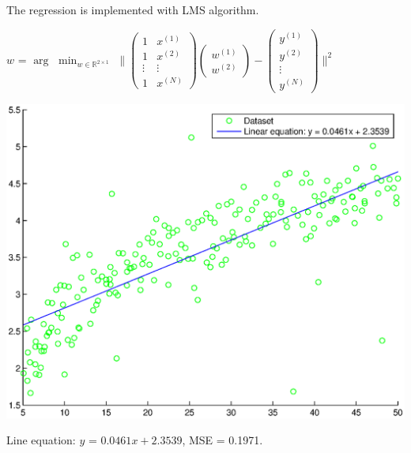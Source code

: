 \documentclass[12pt]{article}
\begin{document}
\begin {enumerate}
\begin {enumerate}
					\noindent\makebox[\linewidth]{\rule{\textwidth}{0.4pt}}
					\begin {flushleft} %
						The regression is implemented with LMS algorithm.
						\begin{center}
							$w$ = $\arg$ $\displaystyle \min_{w \in \mathbb{R}^{2 \times 1}}$
							$\bigg\| 
							\begin{pmatrix}
								1 & x^{(1)} \\
								1 & x^{(2)} \\
								\vdots & \vdots \\
								1 & x^{(N)}
							\end{pmatrix}
							\begin{pmatrix}
								w^{(1)} \\ w^{(2)}
							\end{pmatrix} - 
							\begin{pmatrix}
								y^{(1)} \\ y^{(2)} \\ \vdots \\ y^{(N)}
							\end{pmatrix}
							\bigg\|^2$
						\end{center}
						\begin{center}
							\includegraphics[scale = 0.6]{Q4_d}
						\end{center}
						\begin{center}
							Line equation: $y$ = $0.0461x + 2.3539$, MSE = 0.1971.
						\end{center}
					\end {flushleft}
					\noindent\makebox[\linewidth]{\rule{\textwidth}{0.4pt}}
					

\end{enumerate}
\end{enumerate}
\end{document}

